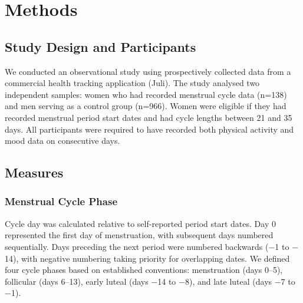 \documentclass[12pt]{article}
\begin{document}


\section*{Methods}

\subsection*{Study Design and Participants}

We conducted an observational study using prospectively collected data from a commercial health tracking application (Juli). The study analysed two independent samples: women who had recorded menstrual cycle data (n=138) and men serving as a control group (n=966). Women were eligible if they had recorded menstrual period start dates and had cycle lengths between 21 and 35 days. All participants were required to have recorded both physical activity and mood data on consecutive days.

\subsection*{Measures}

\subsubsection*{Menstrual Cycle Phase}

Cycle day was calculated relative to self-reported period start dates. Day 0 represented the first day of menstruation, with subsequent days numbered sequentially. Days preceding the next period were numbered backwards ($-$1 to $-$14), with negative numbering taking priority for overlapping dates. We defined four cycle phases based on established conventions: menstruation (days 0--5), follicular (days 6--13), early luteal (days $-$14 to $-$8), and late luteal (days $-$7 to $-$1).
\end{document}

